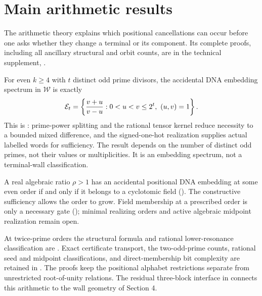 \section{Main arithmetic results}
\label{sec:arithmetic-interface}
The arithmetic theory explains which positional cancellations can occur before one asks whether they change a terminal or its component. Its complete proofs, including all ancillary structural and orbit counts, are in the technical supplement, .

For even $k\ge4$ with $t$ distinct odd prime divisors, the accidental DNA embedding spectrum in $\mathcal W$ is exactly
\[
 \E_t=\left\{\frac{v+u}{v-u}:0<u<v\le2^t,\ (u,v)=1\right\}.
\]
This is : prime-power splitting and the rational tensor kernel reduce necessity to a bounded mixed difference, and the signed-one-hot realization supplies actual labelled words for sufficiency. The result depends on the number of distinct odd primes, not their values or multiplicities. It is an embedding spectrum, not a terminal-wall classification.

A real algebraic ratio $\rho>1$ has an accidental positional DNA embedding at some even order if and only if it belongs to a cyclotomic field (). The constructive sufficiency allows the order to grow. Field membership at a prescribed order is only a necessary gate (); minimal realizing orders and active algebraic midpoint realization remain open.

At twice-prime orders the structural formula and rational lower-resonance classification are . Exact certificate transport, the two-odd-prime counts, rational seed and midpoint classifications, and direct-membership bit complexity are retained in . The proofs keep the positional alphabet restrictions separate from unrestricted root-of-unity relations. The residual three-block interface in  connects this arithmetic to the wall geometry of Section 4.
